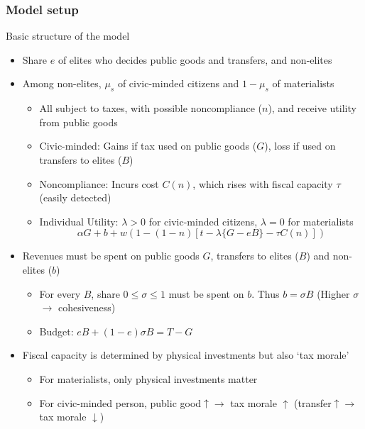 \documentclass[aspectratio=169]{beamer}
\begin{document}
\begin{frame}
\frametitle{Model setup} 
Basic structure of the model
\begin{itemize}\setlength\itemsep{3pt}
\item Share $e$ of elites who decides public goods and transfers, and non-elites
\item Among non-elites, $\mu_s$ of civic-minded citizens and $1-\mu_s$ of materialists
\begin{itemize}\setlength\itemsep{3pt}
\item All subject to taxes, with possible noncompliance ($n$), and receive utility from public goods 
\item Civic-minded: Gains if tax used on public goods ($G$), loss if used on transfers to elites ($B$)
\item Noncompliance: Incurs cost $C(n)$, which rises with fiscal capacity $\tau$ (easily detected)
\item Individual Utility: $\lambda>0$ for civic-minded citizens, $\lambda=0$ for materialists\vspace{-5pt}
\[\alpha G + b + w(1-(1-n)[t-\lambda\{G-eB\}-\tau C(n)])\] 
\end{itemize}\vspace{-10pt}
\item Revenues must be spent on public goods $G$, transfers to elites ($B$) and non-elites ($b$)
\begin{itemize}\setlength\itemsep{3pt}
\item For every $B$, share $0\leq\sigma\leq1$ must be spent on $b$. Thus $b=\sigma B$  (Higher $\sigma$ $\to$ cohesiveness)
\item Budget: $eB+(1-e)\sigma B = T-G $
\end{itemize}
\item Fiscal capacity is determined by physical investments but also `tax morale'
\begin{itemize}\setlength\itemsep{3pt}
  \item For materialists, only physical investments matter
\item For civic-minded person, public good$\uparrow \to$ tax morale $\uparrow$ (transfer$\uparrow\to$ tax morale $\downarrow$)  
\end{itemize}
\end{itemize}
\end{frame}
\end{document}
